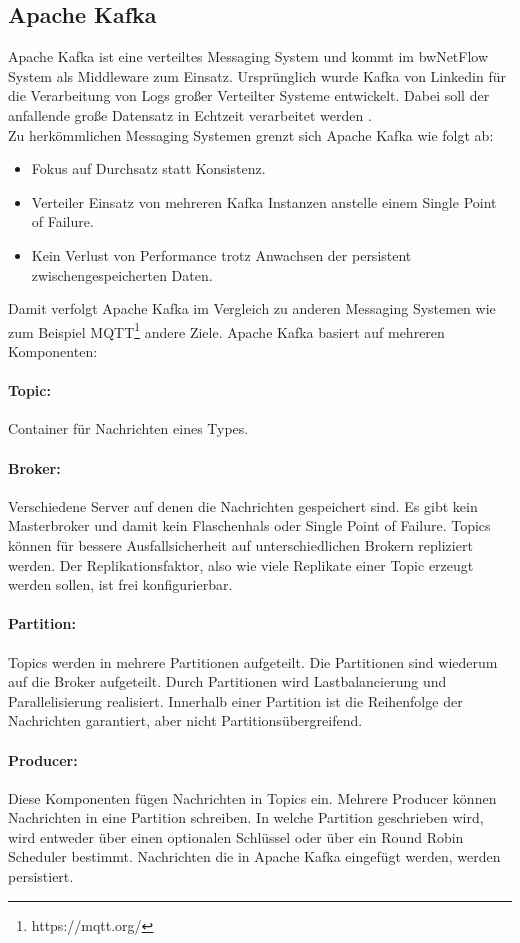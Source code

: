 \documentclass[a4paper, 12pt]{article}
\begin{document}
\subsection{Apache Kafka}
Apache Kafka ist eine verteiltes Messaging System und kommt im bwNetFlow System als Middleware zum Einsatz.
Ursprünglich wurde Kafka von Linkedin für die Verarbeitung von Logs großer Verteilter Systeme entwickelt.
Dabei soll der anfallende große Datensatz in Echtzeit verarbeitet werden  \cite{kreps2011kafka}.
\\
Zu herkömmlichen Messaging Systemen grenzt sich Apache Kafka wie folgt ab:
\begin{itemize}
\item Fokus auf Durchsatz statt Konsistenz.
\item Verteiler Einsatz von mehreren Kafka Instanzen anstelle einem Single Point of Failure.
\item Kein Verlust von Performance trotz Anwachsen der persistent zwischengespeicherten Daten.
\end{itemize}
Damit verfolgt Apache Kafka im Vergleich zu anderen Messaging Systemen wie zum Beispiel MQTT\footnote{https://mqtt.org/} andere Ziele. Apache Kafka basiert auf mehreren Komponenten:
\paragraph{Topic:} Container für Nachrichten eines Types.
\paragraph{Broker:} Verschiedene Server auf denen die Nachrichten gespeichert sind. Es gibt kein Masterbroker und damit kein Flaschenhals oder Single Point of Failure. Topics können für bessere Ausfallsicherheit auf unterschiedlichen Brokern repliziert werden. Der Replikationsfaktor, also wie viele Replikate einer Topic erzeugt werden sollen, ist frei konfigurierbar. 
\paragraph{Partition:} Topics werden in mehrere Partitionen aufgeteilt. Die Partitionen sind wiederum auf die Broker aufgeteilt. Durch Partitionen wird Lastbalancierung und Parallelisierung realisiert. Innerhalb einer Partition ist die Reihenfolge der Nachrichten garantiert, aber nicht Partitionsübergreifend.  
\paragraph{Producer:} Diese Komponenten fügen Nachrichten in Topics ein. Mehrere Producer können Nachrichten in eine Partition schreiben. In welche Partition geschrieben wird, wird entweder über einen optionalen Schlüssel oder über ein Round Robin Scheduler bestimmt. Nachrichten die in Apache Kafka eingefügt werden, werden persistiert.
\end{document}
